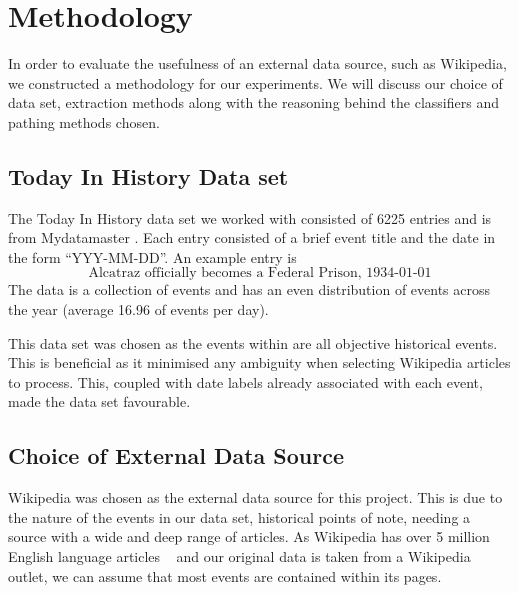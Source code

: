 \documentclass[bsc,frontabs,twoside,singlespacing,parskip,deptreport]{infthesis}     %
\begin{document}
\chapter{Methodology}\label{chapter:methodology}
In order to evaluate the usefulness of an external data source, such as Wikipedia, we constructed a methodology
for our experiments. We will discuss our choice of data set, extraction methods along with the reasoning behind the
classifiers and pathing methods chosen.


\section{Today In History Data set}
The Today In History data set we worked with consisted of 6225 entries and is from Mydatamaster \cite{mydatamaster}.
Each entry consisted of a  brief event title and the date in the form ``YYY-MM-DD''.
An example entry is
\begin{equation}
  \text{Alcatraz officially becomes a Federal Prison, 1934-01-01}\nonumber
\end{equation}
The data is a collection of events and has
an even distribution of events across the year (average 16.96 of events per day).

This data set was chosen as the events within are all objective historical events. This is beneficial as it minimised
any ambiguity when selecting Wikipedia articles to process. This, coupled with date labels already associated with
each event, made the data set favourable.


\section{Choice of External Data Source}
Wikipedia was chosen as the external data source for this project.
This is due to the nature of the events in our data set, historical points of note,
needing a source with a wide and deep range of articles.
As Wikipedia has over 5 million English language articles ~\cite{wikipediasize} and our original data
is taken from a Wikipedia outlet, we can assume
that most events are contained within its pages.
\end{document}
